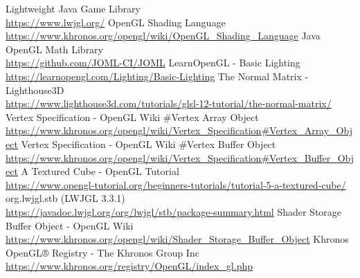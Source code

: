 \documentclass{article}
\begin{document}
\begin{multicols}{2}

    \end{multicols}

    \newpage
    
    \begin{thebibliography}{9}
        
        Lightweight Java Game Library \\
        \url{https://www.lwjgl.org/}
        OpenGL Shading Language \\
        \url{https://www.khronos.org/opengl/wiki/OpenGL_Shading_Language}
        Java OpenGL Math Library \\
        \url{https://github.com/JOML-CI/JOML}
        LearnOpenGL - Basic Lighting \\
        \url{https://learnopengl.com/Lighting/Basic-Lighting}
        The Normal Matrix - Lighthouse3D \\
        \url{https://www.lighthouse3d.com/tutorials/glsl-12-tutorial/the-normal-matrix/}
        Vertex Specification - OpenGL Wiki \#Vertex Array Object \\
        \url{https://www.khronos.org/opengl/wiki/Vertex_Specification#Vertex_Array_Object}
        Vertex Specification - OpenGL Wiki \#Vertex Buffer Object \\
        \url{https://www.khronos.org/opengl/wiki/Vertex_Specification#Vertex_Buffer_Object}
        A Textured Cube - OpenGL Tutorial \\
        \url{https://www.opengl-tutorial.org/beginners-tutorials/tutorial-5-a-textured-cube/}
        org.lwjgl.stb (LWJGL 3.3.1) \\
        \url{https://javadoc.lwjgl.org/org/lwjgl/stb/package-summary.html}
        Shader Storage Buffer Object - OpenGL Wiki \\
        \url{https://www.khronos.org/opengl/wiki/Shader_Storage_Buffer_Object}
        Khronos OpenGL® Registry - The Khronos Group Inc \\
        \url{https://www.khronos.org/registry/OpenGL/index_gl.php}


\end{thebibliography}
\end{document}
